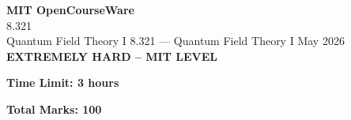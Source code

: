 \documentclass[12pt,a4paper]{exam}
\begin{document}
\begin{center}
{\LARGE \textbf{MIT OpenCourseWare}}\\8.321\\Quantum Field Theory I
\vspace{0.5cm}
{8.321} --- {Quantum Field Theory I}
\vspace{0.3cm}
May 2026
\vspace{0.3cm}
\textbf{EXTREMELY HARD -- MIT LEVEL}
\end{center}

\begin{center}
\textbf{Time Limit: 3 hours}
\end{center}

\begin{center}
\textbf{Total Marks: 100}
\end{center}

\vspace{0.5cm}
\end{document}
